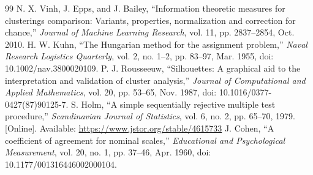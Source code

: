 \documentclass[journal,letterpaper]{IEEEtran}
\begin{document}
\begin{doublespace}
\begin{thebibliography}{99}
 N. X. Vinh, J. Epps, and J. Bailey, ``Information theoretic measures for clusterings comparison: Variants, properties, normalization and correction for chance,'' \emph{Journal of Machine Learning Research}, vol. 11, pp. 2837--2854, Oct. 2010.
 H. W. Kuhn, ``The Hungarian method for the assignment problem,'' \emph{Naval Research Logistics Quarterly}, vol. 2, no. 1--2, pp. 83--97, Mar. 1955, doi: 10.1002/nav.3800020109.
 P. J. Rousseeuw, ``Silhouettes: A graphical aid to the interpretation and validation of cluster analysis,'' \emph{Journal of Computational and Applied Mathematics}, vol. 20, pp. 53--65, Nov. 1987, doi: 10.1016/0377-0427(87)90125-7.
 S. Holm, ``A simple sequentially rejective multiple test procedure,'' \emph{Scandinavian Journal of Statistics}, vol. 6, no. 2, pp. 65--70, 1979. [Online]. Available: \url{https://www.jstor.org/stable/4615733}
 J. Cohen, ``A coefficient of agreement for nominal scales,'' \emph{Educational and Psychological Measurement}, vol. 20, no. 1, pp. 37--46, Apr. 1960, doi: 10.1177/001316446002000104.
\end{thebibliography}
\end{doublespace}
\end{document}
